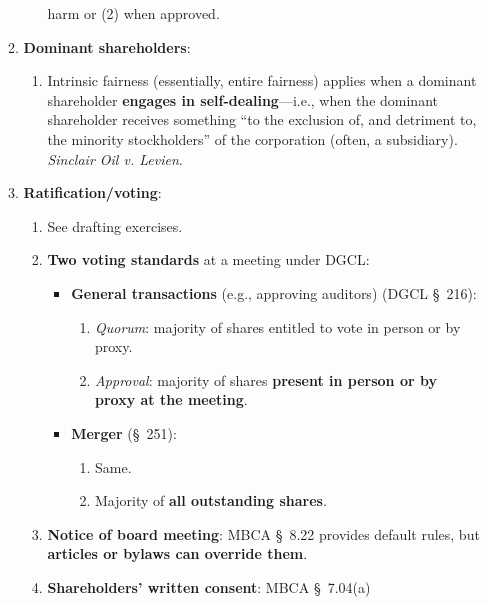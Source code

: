 \begin{enumerate}
\begin{enumerate}
\begin{enumerate}
            harm or (2) when approved.
        \end{enumerate}
        \item \textbf{Dominant shareholders}:
        \begin{enumerate}
            \item Intrinsic fairness (essentially, entire fairness) applies 
            when a dominant shareholder \textbf{engages in 
            self-dealing}---i.e., when the dominant shareholder receives 
            something ``to the exclusion of, and detriment to, the minority 
            stockholders'' of the corporation (often, a subsidiary). 
            \emph{Sinclair Oil v. Levien}.
        \end{enumerate}
        \item \textbf{Ratification/voting}:
        \begin{enumerate}
            \item See drafting exercises.
            \item \textbf{Two voting standards} at a meeting under DGCL:
            \begin{itemize}
                \item \textbf{General transactions} (e.g., approving 
                auditors) (DGCL \S\ 216):
                \begin{enumerate}
                    \item \emph{Quorum}: majority of shares entitled to vote 
                    in person or by proxy.
                    \item \emph{Approval}: majority of shares \textbf{present 
                    in person or by proxy at the meeting}.
                \end{enumerate}
                \item \textbf{Merger} (\S\ 251):
                \begin{enumerate}
                    \item Same.
                    \item Majority of \textbf{all outstanding shares}.
                \end{enumerate}
            \end{itemize}
            \item \textbf{Notice of board meeting}: MBCA \S\ 8.22 provides 
            default rules, but \textbf{articles or bylaws can override them}.
            \item \textbf{Shareholders' written consent}: MBCA \S\ 7.04(a) 

\end{enumerate}
\end{enumerate}
\end{enumerate}
